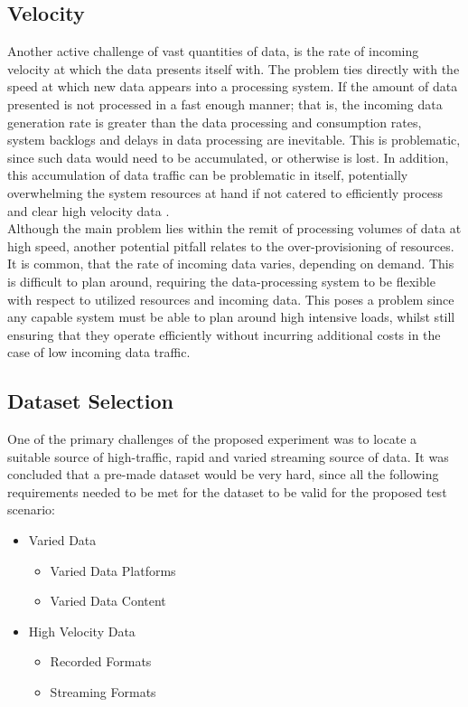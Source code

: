 \documentclass[10pt,conference]{IEEEtran}
\begin{document}
\subsection{Velocity}
Another active challenge of vast quantities of data, is the rate of incoming velocity at which the data presents itself with. The problem ties directly with the speed at which new data appears into a processing system. If the amount of data presented is not processed in a fast enough manner; that is, the incoming data generation rate is greater than the data processing and consumption rates, system backlogs and delays in data processing are inevitable. This is problematic, since such data would need to be accumulated, or otherwise is lost. In addition, this accumulation of data traffic can be problematic in itself, potentially overwhelming the system resources at hand if not catered to efficiently process and clear high velocity data \cite{MgmtRevolution}.
\\
Although the main problem lies within the remit of processing volumes of data at high speed, another potential pitfall relates to the over-provisioning of resources. It is common, that the rate of incoming data varies, depending on demand. This is difficult to plan around, requiring the data-processing system to be flexible with respect to utilized resources and incoming data. This poses a problem since any capable system must be able to plan around high intensive loads, whilst still ensuring that they operate efficiently without incurring additional costs in the case of low incoming data traffic.

\subsection{Dataset Selection}
One of the primary challenges of the proposed experiment was to locate a suitable source of high-traffic, rapid and varied streaming source of data. It was concluded that a pre-made dataset would be very hard, since all the following requirements needed to be met for the dataset to be valid for the proposed test scenario:
\begin{itemize}
\item Varied Data
    \begin{itemize}
        \item Varied Data Platforms
        \item Varied Data Content
    \end{itemize}
\item High Velocity Data
    \begin{itemize}
        \item Recorded Formats
        \item Streaming Formats
    \end{itemize}
\end{itemize}
\end{document}
